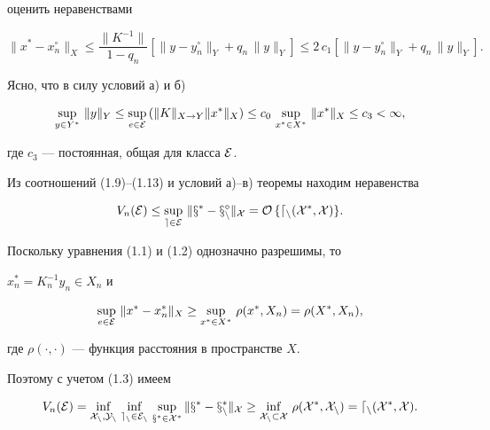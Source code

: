 оценить неравенствами


\begin{equation}


\|x^*-x_n^\circ\|_X \leq \frac{\|K^{-1}\|}{1-q_n}[ \|y-y_n^\circ\|_Y +


q_n\, \|y\|_Y]\leq


2\, c_1[ \|y-y_n^\circ\|_Y +q_n\, \|y\|_Y].


\end{equation}


Ясно, что в силу условий а) и б)


\begin{equation}


\sup_{y\in Y^*}\, \|y\|_Y \leq\sup_{e\in \cal E}\,


(\|K\|_{X\rightarrow Y}\|x^*\|_X)\leq


c_0\, \sup_{x^*\in X^*}\, \|x^*\|_X\leq c_3<\infty ,


\end{equation}


где $c_3$ --- постоянная, общая для класса $\cal E$.


Из соотношений (1.9)--(1.13) и условий а)--в) теоремы находим неравенства


\begin{equation}


V_n(\cal E)\leq \sup_{e\in \cal E}\, \|x^*-x_n^\circ\|_X =


O\, \{ d_n(X^*,X)\}.


\end{equation}





Поскольку уравнения (1.1) и (1.2) однозначно разрешимы, то


$x_n^*=K_n^{-1}y_n\in X_n$ и


$$


\sup_{e\in \cal E}\, \|x^*-x_n^*\|_X\geq \sup_{x^*\in X^*}\,


\rho(x^*,X_n)=\rho(X^*,X_n),


$$


где $\rho(\cdot ,\cdot)$ --- функция расстояния в пространстве $X$.


Поэтому с учетом (1.3) имеем


\begin{equation}


V_n(\cal E)=\inf_{\mathstrut X_n,Y_n}\, \inf_{\mathstrut e_n\in \cal E_n}\,


\sup_{x^*\in X^*}\|x^*-x_n^*\|_X\geq


\inf_{\mathstrut X_n\subset X}\, \rho(X^*,X_n)=d_n(X^*,X).


\end{equation}





